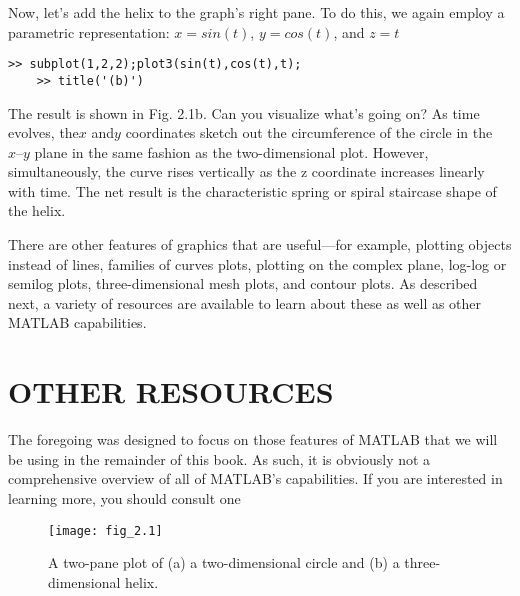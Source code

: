 \documentclass[../main.tex]{subfiles}
\begin{document}
Now, let’s add the helix to the graph’s right pane. To do this, we again employ a parametric representation:
 $x = sin(t)$, $y = cos(t)$, and $z = t$
 \begin{lstlisting}[frame=none, numbers=none]
	>> subplot(1,2,2);plot3(sin(t),cos(t),t);
	>> title('(b)')
\end{lstlisting}
The result is shown in Fig. 2.1b. Can you visualize what’s going on? As time evolves,
the$ x$ and$ y$ coordinates sketch out the circumference of the circle in the $x–y$ plane in the
same fashion as the two-dimensional plot. However, simultaneously, the curve rises vertically as the z coordinate 
increases linearly with time. The net result is the characteristic
spring or spiral staircase shape of the helix.


There are other features of graphics that are useful—for example, plotting objects
instead of lines, families of curves plots, plotting on the complex plane, log-log or semilog
plots, three-dimensional mesh plots, and contour plots. As described next, a variety of resources are available
 to learn about these as well as other MATLAB capabilities.


\section{OTHER RESOURCES}


The foregoing was designed to focus on those features of MATLAB that we will be using
in the remainder of this book. As such, it is obviously not a comprehensive overview of all
of MATLAB’s capabilities. If you are interested in learning more, you should consult one


\begin{figure}[H]
	\centering
	\texttt{[image: fig\_2.1]}
   \caption{\textsf{A two-pane plot of (a) a two-dimensional circle and (b) a three-dimensional helix. }}
   \label{fig_1.}
\end{figure}
\end{document}
